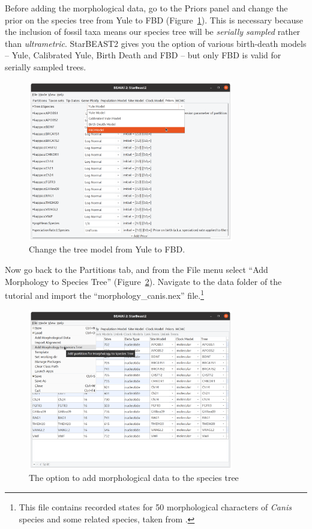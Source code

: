 \documentclass[12pt]{article}
\begin{document}
Before adding the morphological data, go to the Priors panel and change
the prior on the species tree from Yule to FBD
(Figure~\ref{fig:changeTreePrior}). This is necessary because the inclusion of
fossil taxa means our species tree will be \textit{serially sampled} rather
than \textit{ultrametric}. StarBEAST2 gives you the option of various
birth-death models -- Yule, Calibrated Yule, Birth Death and FBD -- but only
FBD is valid for serially sampled trees.

\begin{figure}[htb!]
\centering
\includegraphics[width=0.8\textwidth]{figures/changeTreePrior.png}
\caption
{Change the tree model from Yule to FBD.}
\label{fig:changeTreePrior}
\end{figure}

\newpage{}

Now go back to the Partitions tab, and from the File menu select
``Add Morphology to Species Tree'' (Figure~\ref{fig:addMorphology}).
Navigate to the data folder of the tutorial and import the
``morphology\_canis.nex'' file.\footnote{This file contains recorded states for 50
morphological characters of \textit{Canis} species and some related species,
taken from \cite{Slater2015}.}

\begin{figure}[htb!]
\centering
\includegraphics[width=0.8\textwidth]{figures/addMorphology.png}
\caption
{The option to add morphological data to the species tree}
\label{fig:addMorphology}
\end{figure}
\end{document}
